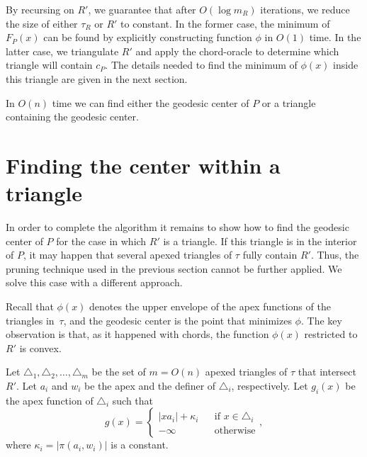 \documentclass[a4paper,UKenglish]{lipics}
\newcommand{\F}[2]{\ensuremath{F_{\scriptscriptstyle #1}(#2)}}
\newcommand{\cp}{\ensuremath{c_P}}
\newcommand{\m}{\ensuremath{m_{\scriptscriptstyle R}}}
\newcommand{\g}[2]{\ensuremath{|\pi(#1, #2)|}}
\newcommand{\reg}{\ensuremath{R'}}
\newcommand{\tcell}{4-cell\xspace}
\newcommand{\tcells}{4-cells\xspace}
\begin{document}
By recursing on $\reg$, we guarantee that after $O(\log \m)$ iterations, we reduce the size of either $\tau_R$ or $\reg$ to constant. 
In the former case, the minimum of $\F{P}{x}$ can be found by explicitly constructing function $\phi$ in $O(1)$ time. 
In the latter case, we triangulate $\reg$ and apply the chord-oracle to determine which triangle will contain $\cp$. 
The details needed to find the minimum of $\phi(x)$ inside this triangle are given in the next section.


\begin{lemma}\label{lemma:Finding the convex trapezoid}
In $O(n)$ time we can find either the geodesic center of $P$ or a triangle containing the geodesic center.
\end{lemma}

\section{Finding the center within a triangle}\label{Section:Solving convex optimization poblem}
In order to complete the algorithm it remains to show how to find the geodesic center of $P$ for the case in which $\reg$ is a triangle. If this triangle is in the interior of $P$, it may happen that several apexed triangles of $\tau$ fully contain $\reg$. 
Thus, the pruning technique used in the previous section cannot be further applied. We solve this case with a different approach.
  
Recall that $\phi(x)$ denotes the upper envelope of the apex functions of the triangles in~$\tau$, and the geodesic center is the point that minimizes $\phi$.
The key observation is that, as it happened with chords, the function $\phi(x)$ restricted to $\reg$ is convex. 

Let $\triangle_{1}, \triangle_{2}, \ldots, \triangle_{m}$ be the set of $m= O(n)$ apexed triangles of $\tau$ that intersect $\reg$. 
Let $a_i$ and $w_i$ be the apex and the definer of $\triangle_i$, respectively.
Let $g_i(x)$  be the apex function of $\triangle_i$ such that 
$$g(x) = \left\{ \begin{array}{lll}
|x a_i| + \kappa_i && \text{if }x\in \triangle_i\\
-\infty&&\text{otherwise}
\end{array}\right. ,$$
where $\kappa_i = \g{a_i}{w_i}$ is a constant.
\end{document}
